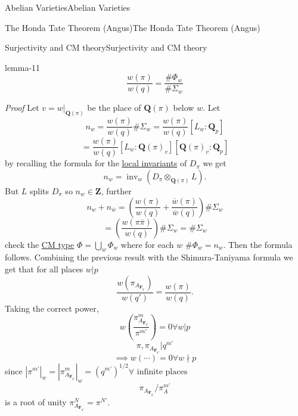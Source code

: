 \documentclass[10pt,]{book}
\makeatletter
\renewcommand*{\proofname}{Proof}
\renewenvironment{proof}[1][\proofname]{\par
  \pushQED{\qed}%
  \normalfont \topsep6\p@\@plus6\p@\relax
  \trivlist
  \item\relax
    {\itshape
    #1\@addpunct{.}}\hspace\labelsep\ignorespaces
}{%
  \popQED\endtrivlist\@endpefalse
}
\numberwithin{equation}{section}
\newcommand{\ZZ}{\mathbf{Z}}
\newcommand{\QQ}{\mathbf{Q}}
\newcommand{\FF}{\mathbf{F}}
\makeatother
\begin{document}
\begin{chapterptx}{Abelian Varieties}{}{Abelian Varieties}{}{}
\begin{sectionptx}{The Honda Tate Theorem (Angus)}{}{The Honda Tate Theorem (Angus)}{}{}
\begin{subsectionptx}{Surjectivity and CM theory}{}{Surjectivity and CM theory}{}{}
\begin{lemma}{}{}{lemma-11}
\begin{equation*}
\frac{w(\pi)}{w(q)} = \frac{\#\Phi_w}{\#\Sigma_w}
\end{equation*}
%
\end{lemma}
\begin{proof}\hypertarget{proof-79}{}
\hypertarget{p-454}{}%
Let \(v = w|_{\QQ(\pi)}\) be the place of \(\QQ(\pi)\) below \(w\). Let%
\begin{equation*}
n_w = \frac{w(\pi)}{w(q)}\#\Sigma_w = \frac{w(\pi)}{w(q)}[L_w :\QQ_p]
\end{equation*}
%
\begin{equation*}
= \frac{w(\pi)}{w(q)}[L_w :\QQ(\pi)_v ][ \QQ(\pi)_v:\QQ_p]
\end{equation*}
by recalling the formula for the \hyperref[def-brauer-gp]{local invariants} of \(D_\pi\) we get%
\begin{equation*}
n_w = \operatorname{inv}_w(D_\pi\otimes_{\QQ(\pi)} L)\text{.}
\end{equation*}
But \(L\) splits \(D_\pi\) so \(n_w \in \ZZ\), further%
\begin{equation*}
n_w + n_{\overline w} = \left( \frac{w(\pi)}{w(q)}  + \frac{\overline w(\pi)}{\overline w(q)} \right) \#\Sigma_w
\end{equation*}
%
\begin{equation*}
= \left( \frac{w(\pi\overline \pi)}{w(q)} \right) \#\Sigma_w = \#\Sigma_w
\end{equation*}
check the \hyperref[def-cm-type]{CM type} \(\Phi = \bigcup_w \Phi_w\) where for each \(w\) \(\# \Phi_w = n_w\). Then the formula follows.%
\end{proof}
\hypertarget{p-455}{}%
Combining the previous result with the Shimura-Taniyama formula we get that for all places \(w|p\)%
\begin{equation*}
\frac{w(\pi_{A_{\FF_{q'}}})}{w(q')} = \frac{w(\pi)}{w(q)}\text{.}
\end{equation*}
Taking the correct power,%
\begin{equation*}
w\left( \frac {\pi^m_{A_{\FF_{q'}}}}{\pi^{m'}}\right) = 0 \forall w|p
\end{equation*}
%
\begin{equation*}
\pi,\pi_{A_{\FF_{q'}}}|q^{m'}
\end{equation*}
%
\begin{equation*}
\implies w(\cdots) = 0 \forall w \nmid p
\end{equation*}
since \(|\pi^{m'}|_w = |\pi_{A_{\FF_{q'}}}^m|_w = (q^{m'})^{1/2} \forall \text{ infinite places}\)%
\begin{equation*}
\pi_{A_{\FF_{q'}}}/ \pi_A^{m'}
\end{equation*}
is a root of unity \(\pi^N_{A_{\FF_{q'}}} = \pi^{N'}\).%
\end{subsectionptx}
\end{sectionptx}
\end{chapterptx}
\end{document}
